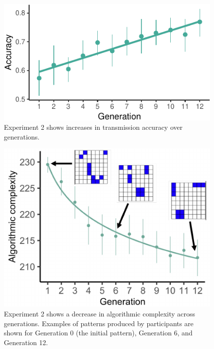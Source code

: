 \documentclass[10pt, letterpaper]{article}
\newenvironment{CodeChunk}{}{}
\begin{document}
\begin{CodeChunk}
\begin{figure}[tb]

{\centering \includegraphics{figs/e2_acc_plot-1} 

}

\caption[Experiment 2 shows increases in transmission accuracy over generations]{Experiment 2 shows increases in transmission accuracy over generations.}\label{fig:e2_acc_plot}
\end{figure}
\end{CodeChunk}

\begin{CodeChunk}
\begin{figure}[tb]

{\centering \includegraphics{figs/e2_withplots-1} 

}

\caption[Experiment 2 shows a decrease in algorithmic complexity across generations]{Experiment 2 shows a decrease in algorithmic complexity across generations. Examples of patterns produced by participants are shown for Generation 0 (the initial pattern), Generation 6, and Generation 12.}\label{fig:e2_withplots}
\end{figure}
\end{CodeChunk}
\end{document}

